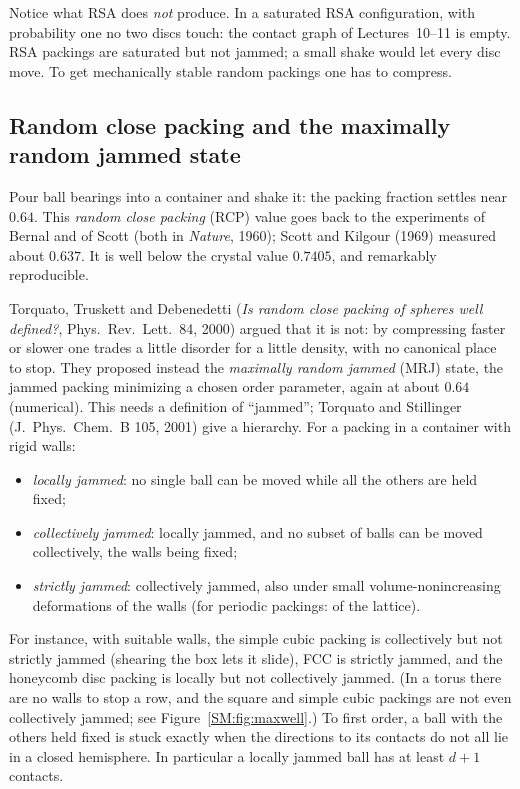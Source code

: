 \documentclass[11pt,openany]{book}
\theoremstyle{plain}
\theoremstyle{definition}
\theoremstyle{remark}
\begin{document}
Notice what RSA does \emph{not} produce. In a saturated RSA configuration, with probability one no two
discs touch: the contact graph of Lectures~10--11 is empty. RSA packings are saturated but not
jammed; a small shake would let every disc move. To get mechanically stable random packings one has to
compress.

\subsection{Random close packing and the maximally random jammed state}

Pour ball bearings into a container and shake it: the packing fraction settles near $0.64$. This
\emph{random close packing} (RCP) value goes back to the experiments of Bernal and of Scott (both in
\emph{Nature}, 1960); Scott and Kilgour (1969) measured about $0.637$. It is well below the crystal value
$0.7405$, and remarkably reproducible.

Torquato, Truskett and Debenedetti (\emph{Is random close packing of spheres well defined?}, Phys.\
Rev.\ Lett.\ 84, 2000) argued that it is not: by compressing faster or slower one trades a little
disorder for a little density, with no canonical place to stop. They proposed instead the
\emph{maximally random jammed} (MRJ) state, the jammed packing minimizing a chosen order parameter,
again at about $0.64$ (numerical). This needs a definition of ``jammed''; Torquato and Stillinger
(J.~Phys.\ Chem.~B 105, 2001) give a hierarchy. For a packing in a container with rigid walls:
\begin{itemize}[nosep]
\item \emph{locally jammed}: no single ball can be moved while all the others are held fixed;
\item \emph{collectively jammed}: locally jammed, and no subset of balls can be moved
  collectively, the walls being fixed;
\item \emph{strictly jammed}: collectively jammed, also under small volume-nonincreasing
  deformations of the walls (for periodic packings: of the lattice).
\end{itemize}
For instance, with suitable walls, the simple cubic packing is collectively but not strictly jammed (shearing the box lets it
slide), FCC is strictly jammed, and the honeycomb disc packing is locally but not collectively jammed.
(In a torus there are no walls to stop a row, and the square and simple cubic packings are not even
collectively jammed; see Figure~\ref{SM:fig:maxwell}.)
To first order, a ball with the others held fixed is stuck exactly when the directions to its contacts
do not all lie in a closed hemisphere. In particular a locally jammed ball has at least $d+1$ contacts.
\end{document}

